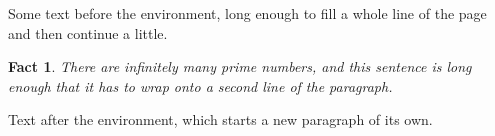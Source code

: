 \documentclass[11pt]{article}
\theoremstyle{indented}
\newtheorem{fact}{Fact}
\begin{document}
Some text before the environment, long enough to fill a whole line of the page and then continue a little.
\begin{fact}
There are infinitely many prime numbers, and this sentence is long enough that it has to wrap onto a second line of the paragraph.
\end{fact}
Text after the environment, which starts a new paragraph of its own.
\end{document}
